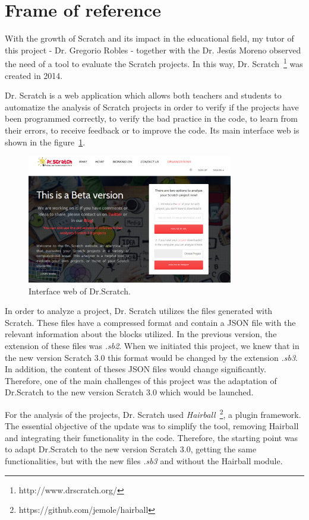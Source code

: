\section{Frame of reference}
\label{sec:reference}

With the growth of Scratch and its impact in the educational field, my tutor of this project - Dr. Gregorio Robles - together with the Dr. Jesús Moreno observed the need of a tool to evaluate the Scratch projects. In this way, Dr. Scratch~\footnote{http://www.drscratch.org/} was created in 2014.

Dr. Scratch is a web application which allows both teachers and students to automatize the analysis of Scratch projects in order to verify if the projects have been programmed correctly, to verify the bad practice in the code, to learn from their errors, to receive feedback or to improve the code. Its main interface web is shown in the figure~\ref{fig:dr_scratch}.

\begin{figure}[h]
  \centering
  \includegraphics[width=9cm, keepaspectratio]{img/dr_scratch.png}
  \caption{Interface web of Dr.Scratch.}
  \label{fig:dr_scratch}
\end{figure}

In order to analyze a project, Dr. Scratch utilizes the files generated with Scratch. These files have a compressed format and contain a JSON file with the relevant information about the blocks utilized. In the previous version, the extension of these files was \textit{.sb2}. When we initiated this project, we knew that in the new version Scratch 3.0 this format would be changed by the extension \textit{.sb3}. In addition, the content of theses JSON files would change significantly. Therefore, one of the main challenges of this project was the adaptation of Dr.Scratch to the new version Scratch 3.0 which would be launched. 

For the analysis of the projects, Dr. Scratch used \textit{Hairball}~\footnote{https://github.com/jemole/hairball}, a plugin framework. The essential objective of the update was to simplify the tool, removing Hairball and integrating their functionality in the code. Therefore, the starting point was to adapt Dr.Scratch to the new version Scratch 3.0, getting the same functionalities, but with the new files \textit{.sb3} and without the Hairball module.

